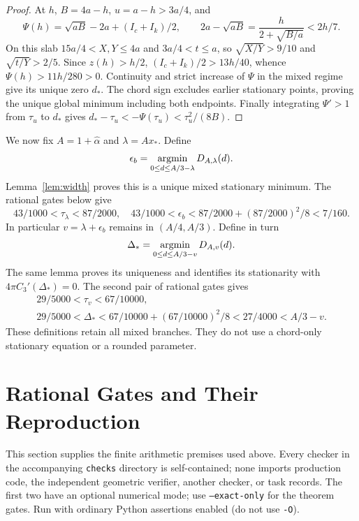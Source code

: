 \documentclass[11pt,letterpaper]{article}
\newcommand{\al}{\widehat\alpha}
\newcommand{\epsb}{\epsilon_b}
\newcommand{\Ds}{\Delta_*}
\begin{document}
\begin{proof}
At $h$, $B=4a-h$, $u=a-h>3a/4$, and
\[
 \Psi(h)=\sqrt{aB}-2a+(I_c+I_k)/2,\qquad
 2a-\sqrt{aB}=\frac h{2+\sqrt{B/a}}<2h/7.
\]
On this slab $15a/4<X,Y\le4a$ and $3a/4<t\le a$, so
$\sqrt{X/Y}>9/10$ and $\sqrt{t/Y}>2/5$.
Since $z(h)>h/2$, $(I_c+I_k)/2>13h/40$, whence
$\Psi(h)>11h/280>0$. Continuity and strict increase of $\Psi$ in the
mixed regime give its unique zero $d_*$. The chord sign excludes earlier
stationary points, proving the unique global minimum including both
endpoints. Finally integrating $\Psi'>1$ from $\tau_u$ to $d_*$ gives
$d_*-\tau_u<-\Psi(\tau_u)<\tau_u^2/(8B)$.
\end{proof}

We now fix $A=1+\al$ and $\lambda=Ax_*$. Define
\begin{equation}\label{eq:epsdefinition}
 \epsb=\mathop{\rm argmin}_{0\le d\le A/3-\lambda}D_{A,\lambda}(d).
\end{equation}
Lemma~\ref{lem:width} proves this is a unique mixed stationary minimum.
The rational gates below give
\[
 43/1000<\tau_\lambda<87/2000,
 \quad 43/1000<\epsb<87/2000+(87/2000)^2/8<7/160.
\]
In particular $v=\lambda+\epsb$ remains in $(A/4,A/3)$.
Define in turn
\begin{equation}\label{eq:Deltadefinition}
 \Ds=\mathop{\rm argmin}_{0\le d\le A/3-v}D_{A,v}(d).
\end{equation}
The same lemma proves its uniqueness and identifies its stationarity
with $4\pi C_3'(\Ds)=0$. The second pair of rational gates gives
\begin{equation}\label{eq:Deltabracket}
\begin{gathered}
 29/5000<\tau_v<67/10000,\\
 29/5000<\Ds<67/10000+(67/10000)^2/8<27/4000<A/3-v.
\end{gathered}
\end{equation}
These definitions retain all mixed branches. They do not use a chord-only
stationary equation or a rounded parameter.

\section{Rational Gates and Their Reproduction}\label{sec:gates}
This section supplies the finite arithmetic premises used above. Every
checker in the accompanying \texttt{checks} directory is self-contained;
none imports production code, the independent geometric verifier, another
checker, or task records. The first two have an optional numerical mode;
use \texttt{--exact-only} for the theorem gates. Run with ordinary Python
assertions enabled (do not use \texttt{-O}).
\end{document}
